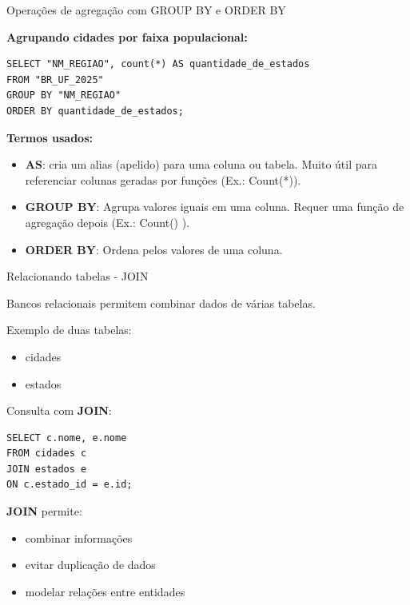 \documentclass{beamer}
\begin{document}
\begin{frame}[fragile]{Operações de agregação com GROUP BY e ORDER BY}

\textbf{Agrupando cidades por faixa populacional:}

\begin{verbatim}
SELECT "NM_REGIAO", count(*) AS quantidade_de_estados
FROM "BR_UF_2025"
GROUP BY "NM_REGIAO"
ORDER BY quantidade_de_estados;
\end{verbatim}

\vspace{0.3cm}

\textbf{Termos usados:}
\begin{itemize}
\item \textbf{AS}: cria um alias (apelido) para uma coluna ou tabela. Muito útil para referenciar colunas geradas por funções (Ex.: Count(*)).
\item \textbf{GROUP BY}: Agrupa valores iguais em uma coluna. Requer uma função de agregação depois (Ex.: Count() ).
\item \textbf{ORDER BY}: Ordena pelos valores de uma coluna.
\end{itemize}



\end{frame}

\begin{frame}[fragile]{Relacionando tabelas - JOIN}
    
    Bancos relacionais permitem combinar dados de várias tabelas.
    
    Exemplo de duas tabelas:
    
    \begin{itemize}
        \item cidades
        \item estados
    \end{itemize}
    
    Consulta com \textbf{JOIN}:
    
    \begin{verbatim}
SELECT c.nome, e.nome
FROM cidades c
JOIN estados e
ON c.estado_id = e.id;
    \end{verbatim}
    
    \textbf{JOIN} permite:
    
    \begin{itemize}
        \item combinar informações
        \item evitar duplicação de dados
        \item modelar relações entre entidades
    \end{itemize}
    
\end{frame}
\end{document}
